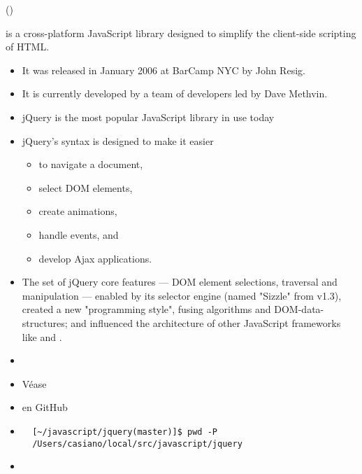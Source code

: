 
 ()

 is a cross-platform JavaScript library designed to simplify
the client-side scripting of HTML. 

\begin{itemize}
\item
It was released in January 2006
at BarCamp NYC by John Resig. 

\item
It is currently developed by a team of
developers led by Dave Methvin. 

\item
jQuery is the most popular JavaScript library in
use today

\item
jQuery's syntax is designed to make it easier 
\begin{itemize}
\item
to navigate a document,
\item
select DOM elements, 
\item
create animations, 
\item
handle events, and 
\item
develop Ajax applications. 
\end{itemize}

\item
The set of jQuery core features — DOM element selections, traversal
and manipulation — enabled by its selector engine (named "Sizzle"
from v1.3), created a new "programming style", fusing algorithms and
DOM-data-structures; and influenced the architecture of other JavaScript
frameworks like  and .
\item
\end{itemize}


  \begin{itemize}
  \item
  Véase
  \item
     en GitHub
  \item
  \begin{verbatim}
  [~/javascript/jquery(master)]$ pwd -P
  /Users/casiano/local/src/javascript/jquery
  \end{verbatim}
  \item {}
  \end{itemize}

